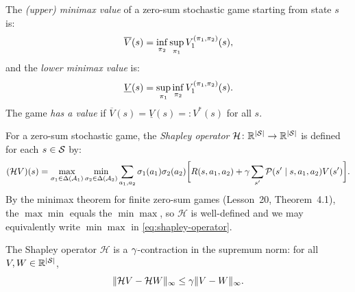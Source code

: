 \documentclass[11pt,a4paper]{article}
\begin{document}
\begin{definition}
\label{def:minimax-value}
The \emph{(upper) minimax value} of a zero-sum stochastic game
starting from state $s$ is:
\begin{equation}
\label{eq:minimax-value}
  \overline{V}(s)
  = \inf_{\pi_2} \sup_{\pi_1}
    V_1^{(\pi_1, \pi_2)}(s),
\end{equation}
and the \emph{lower minimax value} is:
\begin{equation}
  \underline{V}(s)
  = \sup_{\pi_1} \inf_{\pi_2}
    V_1^{(\pi_1, \pi_2)}(s).
\end{equation}
The game \emph{has a value} if
$\overline{V}(s) = \underline{V}(s) =: V^*(s)$ for all $s$.
\end{definition}

\begin{definition}
\label{def:shapley-operator}
For a zero-sum stochastic game, the \emph{Shapley operator}
$\mathcal{H} \colon \mathbb{R}^{|\mathcal{S}|} \to \mathbb{R}^{|\mathcal{S}|}$ is defined
for each $s \in \mathcal{S}$ by:
\begin{equation}
\label{eq:shapley-operator}
  (\mathcal{H} V)(s) =
  \max_{\sigma_1 \in \Delta(\mathcal{A}_1)}
  \min_{\sigma_2 \in \Delta(\mathcal{A}_2)}
  \sum_{a_1, a_2} \sigma_1(a_1) \sigma_2(a_2)
  \biggl[R(s, a_1, a_2) + \gamma
    \sum_{s'} \mathcal{P}(s' \mid s, a_1, a_2) V(s')\biggr].
\end{equation}
By the minimax theorem for finite zero-sum games
(Lesson~20, Theorem~4.1), the $\max\min$ equals the $\min\max$, so
$\mathcal{H}$ is well-defined and we may equivalently write
$\min\max$ in \eqref{eq:shapley-operator}.
\end{definition}

\begin{lemma}
\label{lem:shapley-contraction}
The Shapley operator $\mathcal{H}$ is a $\gamma$-contraction in the
supremum norm: for all $V, W \in \mathbb{R}^{|\mathcal{S}|}$,
\begin{equation}
\label{eq:shapley-contraction}
  \|\mathcal{H} V - \mathcal{H} W\|_\infty
  \leq \gamma \|V - W\|_\infty.
\end{equation}
\end{lemma}
\end{document}
